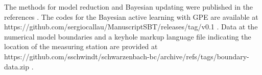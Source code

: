 \documentclass[draft,linenumbers,onecolumn]{agujournal2019} %
\begin{document}
The methods for model reduction and Bayesian updating were published in the references . The codes for the Bayesian active learning with GPE are available at https://github.com/sergiocallau/ManuscriptSBT/releases/tag/v0.1 \cite{msdata_callau_git_2022}. Data at the numerical model boundaries and a keyhole markup language file indicating the location of the measuring station are provided at https://github.com/sschwindt/schwarzenbach-bc/archive/refs/tags/boundary-data.zip \cite{msdata_schwindt_git_2022}.


%
%





%
%
%
%
%
\end{document}
